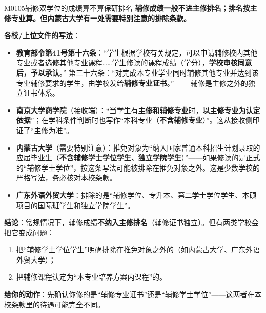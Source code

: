 \begin{qa}{M0105}{辅修双学位的成绩算不算保研排名}
\textbf{辅修成绩一般不进主修排名；排名按主修专业算。但内蒙古大学有一处需要特别注意的排除条款。}

\textbf{各校/上位文件的写法}：

\begin{itemize}
  \item \textbf{教育部令第41号第十六条}：“学生根据学校有关规定，可以申请辅修校内其他专业或者选修其他专业课程……学生修读的课程成绩（学分），\textbf{学校审核同意后，予以承认}。” 第三十六条：“对完成本专业学业同时辅修其他专业并达到该专业辅修要求的学生，由学校发给\textbf{辅修专业证书}。” ——辅修是主修之外的独立证书体系。
  \item \textbf{南京大学商学院}（接收端）：“当学生有\textbf{主修和辅修专业}时，\textbf{以主修专业为认定依据}”；在学科条件判断时也写作“本科专业（\textbf{不含辅修专业}）”。这从接收侧印证了“主修为准”。
  \item \textbf{内蒙古大学}（需要特别注意）：推免对象为“纳入国家普通本科招生计划录取的应届毕业生（\textbf{不含辅修学士学位学生、独立学院学生}）”——如果修读的是正式的“辅修学士学位”，按这条写法可能被排除在推免对象之外。这是少数学校的严格写法，务必核对本校条款。
  \item \textbf{广东外语外贸大学}：排除的是“辅修学位、专升本、第二学士学位学生、本硕项目的国际班学生和独立学院学生”。
\end{itemize}

\textbf{结论}：常规情况下，辅修成绩\textbf{不纳入主修排名}（辅修证书独立）。但有两类学校会把它变成问题：
\begin{enumerate}
  \item 把“辅修学士学位学生”明确排除在推免对象之外的（如内蒙古大学、广东外语外贸大学）；
  \item 把辅修课程认定为“本专业培养方案内课程”的。
\end{enumerate}

\textbf{给你的动作}：先确认你修的是“辅修专业证书”还是“辅修学士学位”——这两者在本校条款里的待遇可能完全不同。
\end{qa}

